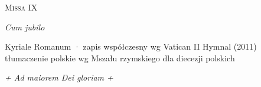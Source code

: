 



\begin{center}
  {\Huge\scshape Missa IX}\par\smallskip
  {\Large\itshape Cum jubilo}\par\smallskip
  {\small Kyriale Romanum · zapis współczesny wg Vatican II Hymnal (2011)\\
   tłumaczenie polskie wg Mszału rzymskiego dla diecezji polskich}
\end{center}



\clearpage




\vfill
{\centering\itshape + Ad maiorem Dei gloriam +\par}


